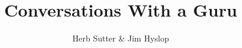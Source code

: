 \documentclass[12pt,a4paper,onecolumn]{article}
\title{Conversations With a Guru}
\author{Herb Sutter \& Jim Hyslop}
\begin{document}
\date{}
\maketitle
\begin{center}
\tableofcontents
\end{center}
\pagebreak
\begin{sffamily}



\pagebreak
\end{sffamily}
\end{document}
